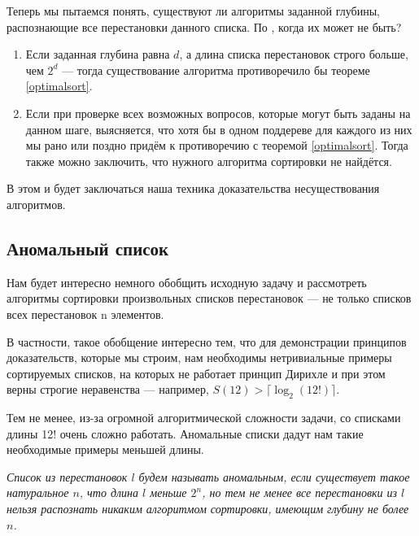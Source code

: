 Теперь мы пытаемся понять, существуют ли алгоритмы заданной глубины, распознающие все перестановки данного списка. По \cite{Knuth}, когда их может не быть?

\begin{enumerate}
\item Если заданная глубина равна $d$, а длина списка перестановок строго больше, чем $2^d$ — тогда существование алгоритма противоречило бы теореме \ref{optimalsort}.

\item Если при проверке всех возможных вопросов, которые могут быть заданы на данном шаге, выясняется, что хотя бы в одном поддереве для каждого из них мы рано или поздно придём к противоречию с теоремой \ref{optimalsort}. Тогда также можно заключить, что нужного алгоритма сортировки не найдётся.
\end{enumerate}

\abz В этом и будет заключаться наша техника доказательства несуществования алгоритмов.

\vfill\eject
\subsection
[Пример «аномального» списка]
{Аномальный список}


\abz Нам будет интересно немного обобщить исходную задачу и рассмотреть алгоритмы сортировки произвольных списков перестановок — не только списков всех перестановок n элементов.

\abz В частности, такое обобщение интересно тем, что для демонстрации принципов доказательств, которые мы строим, нам необходимы нетривиальные примеры сортируемых списков, на которых не работает принцип Дирихле и при этом верны строгие неравенства — например, $S(12) > \lceil \log_2 (12!) \rceil$.

\abz Тем не менее, из-за огромной алгоритмической сложности задачи, со списками длины 12! очень сложно работать. Аномальные списки дадут нам такие необходимые примеры меньшей длины.

 {\it Список из перестановок $l$ будем называть аномальным, если существует такое натуральное $n$, что длина $l$ меньше $2^n$, но тем не менее все перестановки из $l$ нельзя распознать никаким алгоритмом сортировки, имеющим глубину не более $n$.}

